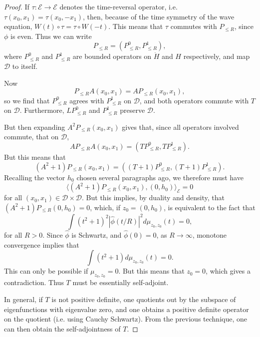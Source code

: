 \begin{proof}
    If $\tau: \mathcal{E} \to \mathcal{E}$ denotes the time-reversal operator, i.e. $\tau(x_0,x_1) = \tau(x_0,-x_1)$, then, because of the time symmetry of the wave equation, $W(t) \circ \tau = \tau \circ W(-t)$. This means that $\tau$ commutes with $P_{\leq R}$, since $\phi$ is even. Thus we can write
    \[ P_{\leq R} = (P_{\leq R}^0, P_{\leq R}^1), \]
    where $P_{\leq R}^0$ and $P_{\leq R}^1$ are bounded operators on $\dot{H}$ and $H$ respectively, and map $\mathcal{D}$ to itself.

    Now
    \[ P_{\leq R} A(x_0,x_1) = A P_{\leq R}(x_0,x_1), \]
    so we find that $P_{\leq R}^0$ agrees with $P_{\leq R}^1$ on $\mathcal{D}$, and both operators commute with $T$ on $\mathcal{D}$. Furthermore, $L P_{\leq R}^0$ and $P_{\leq R}^1$ preserve $\mathcal{D}$.

    But then expanding $A^2 P_{\leq R}(x_0,x_1)$ gives that, since all operators involved commute, that on $\mathcal{D}$,
    \[ AP_{\leq R}A(x_0,x_1) = (TP_{\leq R}^0, TP_{\leq R}^1). \]
    But this means that
    \[ (A^2 + 1) P_{\leq R}(x_0,x_1) = ((T + 1) P_{\leq R}^0, (T + 1) P_{\leq R}^1). \]
    Recalling the vector $h_0$ chosen several paragraphs ago, we therefore must have
    \[ \langle (A^2 + 1) P_{\leq R}(x_0,x_1), (0,h_0) \rangle_{\mathcal{E}} = 0 \]
    for all $(x_0,x_1) \in \mathcal{D} \times \mathcal{D}$. But this implies, by duality and density, that $(A^2 + 1) P_{\leq R} (0, h_0) = 0$, which, if $z_0 = (0,h_0)$, is equivalent to the fact that
    \[ \int (t^2 + 1)^2 |\widehat{\phi}(t/R)|^2 d\mu_{z_0,z_0}(t) = 0, \]
    for all $R > 0$. Since $\widehat{\phi}$ is Schwartz, and $\widehat{\phi}(0) = 0$, as $R \to \infty$, monotone convergence implies that
    \[ \int (t^2 + 1) d\mu_{z_0,z_0}(t) = 0. \]
    This can only be possible if $\mu_{z_0,z_0} = 0$. But this means that $z_0 = 0$, which gives a contradiction. Thus $T$ must be essentially self-adjoint.

    In general, if $T$ is not positive definite, one quotients out by the subspace of eigenfunctions with eigenvalue zero, and one obtains a positive definite operator on the quotient (i.e. using Cauchy Schwartz). From the previous technique, one can then obtain the self-adjointness of $T$.
\end{proof}

